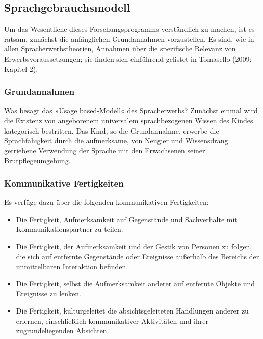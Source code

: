 \documentclass[
  letterpaper,
]{scrbook}
\begin{document}
\hypertarget{sprachgebrauchsmodell}{%
\subsection{Sprachgebrauchsmodell}\label{sprachgebrauchsmodell}}

Um das Wesentliche dieses Forschungsprogramms verständlich zu machen,
ist es ratsam, zunächst die anfänglichen Grundannahmen vorzustellen. Es
sind, wie in allen Spracherwerbstheorien, Annahmen über die spezifische
Relevanz von Erwerbsvoraussetzungen; sie finden sich einführend gelistet
in Tomasello (2009: Kapitel 2).

\hypertarget{grundannahmen}{%
\subsubsection{Grundannahmen}\label{grundannahmen}}

Was besagt das »Usage based-Modell« des Spracherwerbs? Zunächst einmal
wird die Existenz von angeborenem universalem sprachbezogenen Wissen des
Kindes kategorisch bestritten. Das Kind, so die Grundannahme, erwerbe
die Sprachfähigkeit durch die aufmerksame, von Neugier und Wissensdrang
getriebene Verwendung der Sprache mit den Erwachsenen seiner
Brutpflegeumgebung.

\hypertarget{kommunikative-fertigkeiten}{%
\subsubsection{Kommunikative
Fertigkeiten}\label{kommunikative-fertigkeiten}}

Es verfüge dazu über die folgenden kommunikativen Fertigkeiten:

\begin{itemize}
\item
  Die Fertigkeit, Aufmerksamkeit auf Gegenstände und Sachverhalte mit
  Kommunikationspartner zu teilen.
\item
  Die Fertigkeit, der Aufmerksamkeit und der Gestik von Personen zu
  folgen, die sich auf entfernte Gegenstände oder Ereignisse außerhalb
  des Bereichs der unmittelbaren Interaktion befinden.
\item
  Die Fertigkeit, selbst die Aufmerksamkeit anderer auf entfernte
  Objekte und Ereignisse zu lenken.
\item
  Die Fertigkeit, kulturgeleitet die absichtsgeleiteten Handlungen
  anderer zu erlernen, einschließlich kommunikativer Aktivitäten und
  ihrer zugrundeliegenden Absichten.
\end{itemize}
\end{document}
